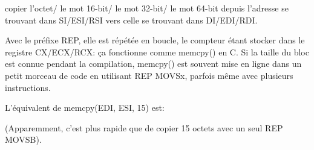 \item[MOVSB/MOVSW/MOVSD/MOVSQ]
copier l'octet/
le mot 16-bit/
le mot 32-bit/
le mot 64-bit
depuis l'adresse se trouvant dans SI/ESI/RSI vers celle se trouvant dans DI/EDI/RDI.

\label{REP_MOVSx}
Avec le préfixe REP, elle est répétée en boucle, le compteur étant stocker dans le
registre CX/ECX/RCX:
ça fonctionne comme memcpy() en C.
Si la taille du bloc est connue pendant la compilation, memcpy() est souvent mise
en ligne dans un petit morceau de code en utilisant REP MOVSx, parfois même avec
plusieurs instructions.

L'équivalent de memcpy(EDI, ESI, 15) est:



(Apparemment, c'est plus rapide que de copier 15 octets avec un seul REP MOVSB).
